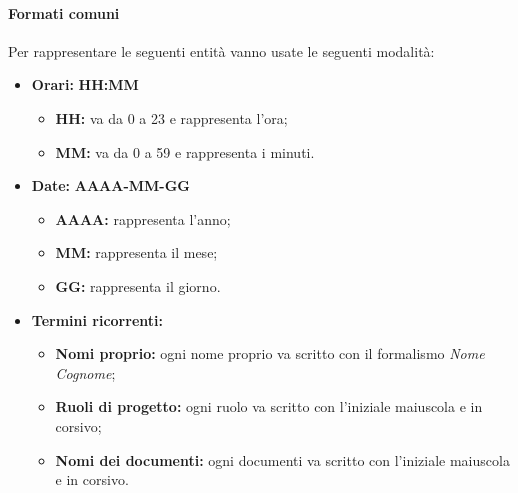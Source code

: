		\paragraph{Formati comuni} \Spazio
		\label{formati}
		Per rappresentare le seguenti entità vanno usate le seguenti modalità:
		\begin{itemize}
			
			\item \textbf{Orari:}
			\textbf{HH:MM}
				\begin{itemize}
					\item \textbf{HH:} va da 0 a 23 e rappresenta l'ora;
					\item \textbf{MM:} va da 0 a 59 e rappresenta i minuti.
				\end{itemize}
			
			\item \textbf{Date:}
			\textbf{AAAA-MM-GG}
				\begin{itemize}
					\item \textbf{AAAA:} rappresenta l'anno;
					\item \textbf{MM:} rappresenta il mese;
					\item \textbf{GG:} rappresenta il giorno.
				\end{itemize}
			
			\item \textbf{Termini ricorrenti:}
			\begin{itemize}
				\item \textbf{Nomi proprio:} ogni nome proprio va scritto con il formalismo \textit{Nome Cognome};
				\item \textbf{Ruoli di progetto:} ogni ruolo va scritto con l'iniziale maiuscola e in corsivo;
				\item \textbf{Nomi dei documenti:} ogni documenti va scritto con l'iniziale maiuscola e in corsivo.
			\end{itemize}
			
		\end{itemize}
		
